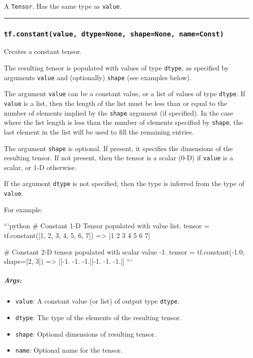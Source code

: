 A \texttt{Tensor}. Has the same type as \texttt{value}.

\begin{center}\rule{0.5\linewidth}{\linethickness}\end{center}

\subsubsection{\texorpdfstring{\texttt{tf.constant(value,\ dtype=None,\ shape=None,\ name=\textquotesingle{}Const\textquotesingle{})}
}{tf.constant(value, dtype=None, shape=None, name='Const') }}\label{tf.constantvalue-dtypenone-shapenone-nameconst}

Creates a constant tensor.

The resulting tensor is populated with values of type \texttt{dtype}, as
specified by arguments \texttt{value} and (optionally) \texttt{shape}
(see examples below).

The argument \texttt{value} can be a constant value, or a list of values
of type \texttt{dtype}. If \texttt{value} is a list, then the length of
the list must be less than or equal to the number of elements implied by
the \texttt{shape} argument (if specified). In the case where the list
length is less than the number of elements specified by \texttt{shape},
the last element in the list will be used to fill the remaining entries.

The argument \texttt{shape} is optional. If present, it specifies the
dimensions of the resulting tensor. If not present, then the tensor is a
scalar (0-D) if \texttt{value} is a scalar, or 1-D otherwise.

If the argument \texttt{dtype} is not specified, then the type is
inferred from the type of \texttt{value}.

For example:

```python \# Constant 1-D Tensor populated with value list. tensor =
tf.constant({[}1, 2, 3, 4, 5, 6, 7{]}) =\textgreater{} {[}1 2 3 4 5 6
7{]}

\# Constant 2-D tensor populated with scalar value -1. tensor =
tf.constant(-1.0, shape={[}2, 3{]}) =\textgreater{} {[}{[}-1. -1.
-1.{]}{[}-1. -1. -1.{]}{]} ```

\subparagraph{Args: }\label{args-5}

\begin{itemize}
\item
  \texttt{value}: A constant value (or list) of output type
  \texttt{dtype}.
\item
  \texttt{dtype}: The type of the elements of the resulting tensor.
\item
  \texttt{shape}: Optional dimensions of resulting tensor.
\item
  \texttt{name}: Optional name for the tensor.
\end{itemize}

